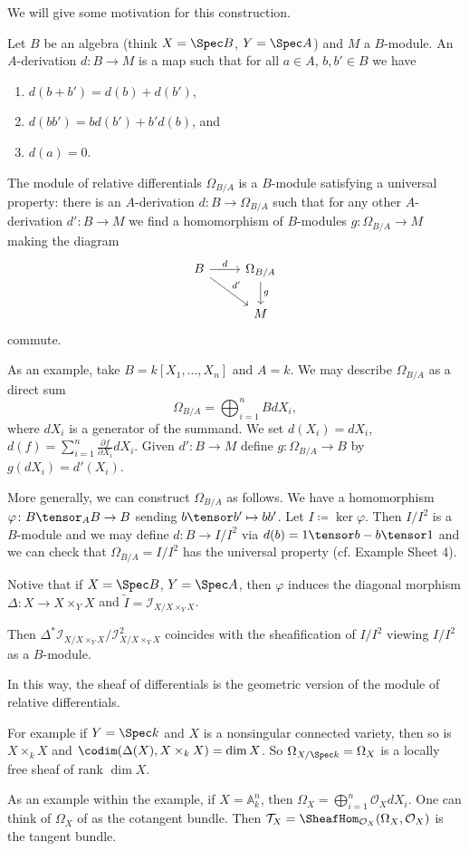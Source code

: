 We will give some motivation for this construction.

Let $B$ be an algebra (think $X = \Spec B$, $Y = \Spec A$) and $M$ a $B$-module.
An $A$-derivation $d\colon B\to M$ is a map such that for all $a \in A$, $b, b' \in B$ we have
\begin{enumerate}
	\item $d(b + b') = d(b) + d(b')$,
	\item $d(bb') = bd(b') + b'd(b)$, and
	\item $d(a) = 0$.
\end{enumerate}

The module of relative differentials $\Omega_{B/A}$ is a $B$-module satisfying
a universal property: there is an $A$-derivation $d\colon B\to \Omega_{B/A}$ such
that for any other $A$-derivation $d'\colon B\to M$ we find a homomorphism
of $B$-modules $g\colon \Omega_{B/A}\to M$ making the diagram
\[\begin{tikzcd}
	B\ar[r, "d"]\ar[dr, "d'"] & \Omega_{B/A}\ar[d, "g"]\\
	& M
\end{tikzcd}\]
commute.

As an example, take $B = k[X_1, \ldots, X_n]$ and $A = k$. We may describe
$\Omega_{B/A}$ as a direct sum
\[ \Omega_{B/A} = \bigoplus_{i=1}^n BdX_i, \]
where $dX_i$ is a generator of the summand. We set $d(X_i) = dX_i$, $d(f) = \sum_{i=1}^n \frac{\partial f}{\partial X_i} dX_i$.
Given $d'\colon B\to M$ define $g\colon \Omega_{B/A} \to B$ by $g(dX_i) = d'(X_i)$.

More generally, we can construct $\Omega_{B/A}$ as follows. We have a homomorphism
$\varphi\colon B\tensor_A B\to B$ sending $b\tensor b'\mapsto bb'$. Let $I\coloneqq \ker\varphi$.
Then $I/I^2$ is a $B$-module and we may define $d\colon B\to I/I^2$ via
$d(b) = 1\tensor b-b\tensor 1$ and we can check that $\Omega_{B/A} = I/I^2$ has
the universal property (cf. Example Sheet 4).

Notive that if $X = \Spec B$, $Y = \Spec A$, then $\varphi$ induces the diagonal
morphism $\Delta\colon X\to X\times_Y X$ and $\tilde{I} = \mathcal{I}_{X/X\times_Y X}$.

Then $\Delta^*\mathcal{I}_{X/X\times_Y X}/\mathcal{I}_{X/X\times_Y X}^2$
coincides with the sheafification of $I/I^2$ viewing $I/I^2$ as a $B$-module.

In this way, the sheaf of differentials is the geometric version of the module
of relative differentials.

For example if $Y = \Spec k$ and $X$ is a nonsingular connected variety, then
so is $X\times_k X$ and $\codim(\Delta(X), X\times_k X) = \dim X$.
So $\Omega_{X/\Spec k} = \Omega_X$ is a locally free sheaf of rank $\dim X$.

As an example within the example, if $X = \mathbb{A}^n_k$, then $\Omega_X = \bigoplus_{i=1}^n \mathcal{O}_X dX_i$.
One can think of $\Omega_X$ of as the cotangent bundle. Then
$\mathcal{T}_X = \SheafHom_{\mathcal{O}_X}(\Omega_X, \mathcal{O}_X)$ is the tangent
bundle.
